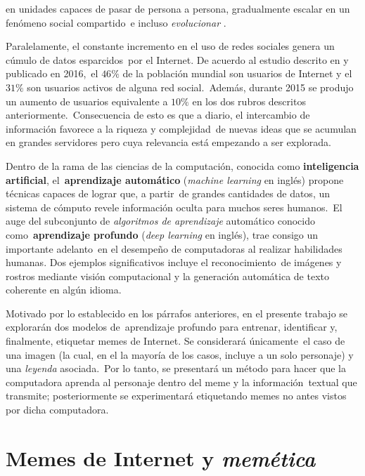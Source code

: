 en unidades capaces de pasar de persona a persona, gradualmente escalar en un fenómeno social compartido\
e incluso \emph{evolucionar} \cite{shifman2014}.\par
Paralelamente, el constante incremento en el uso de redes sociales genera un cúmulo de datos esparcidos\
por el Internet. De acuerdo al estudio descrito en \cite{website:smartinsights} y publicado en 2016,\
el $46\%$ de la población mundial son usuarios de Internet y el $31\%$ son usuarios activos de alguna red social.\
Además, durante 2015 se produjo un aumento de usuarios equivalente a $10\%$ en los dos rubros descritos anteriormente.\
Consecuencia de esto es que a diario, el intercambio de información favorece a la riqueza y complejidad\
de nuevas ideas que se acumulan en grandes servidores pero cuya relevancia está empezando a ser explorada.\par
Dentro de la rama de las ciencias de la computación, conocida como \textbf{inteligencia artificial}, el\
\textbf{aprendizaje automático} (\emph{machine learning} en inglés) propone técnicas capaces de lograr que, a partir\
de grandes cantidades de datos, un sistema de cómputo revele información oculta para muchos seres humanos.\
El auge del subconjunto de \emph{algoritmos de aprendizaje} automático conocido como\
\textbf{aprendizaje profundo} (\emph{deep learning} en inglés), trae consigo un importante adelanto\
en el desempeño de computadoras al realizar habilidades humanas. Dos ejemplos significativos incluye el reconocimiento\
de imágenes y rostros mediante visión computacional y la generación automática de texto coherente en algún idioma.\par
Motivado por lo establecido en los párrafos anteriores, en el presente trabajo se explorarán dos modelos de\
aprendizaje profundo para entrenar, identificar y, finalmente, etiquetar memes de Internet. Se considerará únicamente\
el caso de una imagen (la cual, en el la mayoría de los casos, incluye a un solo personaje) y una \emph{leyenda} asociada.\
Por lo tanto, se presentará un método para hacer que la computadora aprenda al personaje dentro del meme y la información\
textual que transmite; posteriormente se experimentará etiquetando memes no antes vistos por dicha computadora.

\section{Memes de Internet y \emph{memética}}

